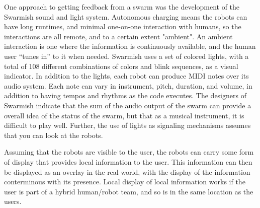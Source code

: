 \documentclass[]{article}
\begin{document}
One approach to getting feedback from a swarm was the development of the Swarmish sound and light system\cite{mclurkin2006speaking}. 
Autonomous charging means the robots can have long runtimes, and minimal one-on-one interaction with humans, so the interactions are all remote, and to a certain extent "ambient". 
An ambient interaction is one where the information is continuously available, and the human user ``tunes in'' to it when needed. Swarmish uses a set of colored lights, with a total of 108 different combinations of colors and blink sequences, as a visual indicator. 
In addition to the lights, each robot can produce MIDI notes over its audio system. 
Each note can vary in instrument, pitch, duration, and volume, in addition to having tempos and rhythms as the code executes. 
The designers of Swarmish indicate that the sum of the audio output of the swarm can provide a overall idea of the status of the swarm, but that as a musical instrument, it is difficult to play well. 
Further, the use of lights as signaling mechanisms assumes that you can look at the robots. 

Assuming that the robots are visible to the user, the robots can carry some form of display that provides local information to the user. 
This information can then be displayed as an overlay in the real world, with the display of the information conterminous with its presence\cite{Daily:2003:WEI:820752.821587}. 
Local display of local information works if the user is part of a hybrid human/robot team, and so is in the same location as the users. 
\end{document}
